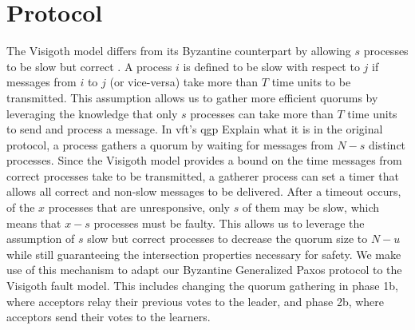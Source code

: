 \section{Protocol} 

The Visigoth model differs from its Byzantine counterpart by allowing $s$ processes to be slow but correct \cite{Porto2015}. A process $i$ is defined to be slow with respect to $j$ if messages from $i$ to $j$ (or vice-versa) take more than $T$ time units to be transmitted. This assumption allows us to gather more efficient quorums by leveraging the knowledge that only $s$ processes can take more than $T$ time units to send and process a message. In \acrshort{vft}'s \acrfull{qgp} {\color{red} Explain what it is in the original protocol}, a process gathers a quorum by waiting for messages from $N-s$ distinct processes. Since the Visigoth model provides a bound on the time messages from correct processes take to be transmitted, a gatherer process can set a timer that allows all correct and non-slow  messages to be delivered. After a timeout occurs, of the $x$ processes that are unresponsive, only $s$ of them may be slow, which means that $x-s$ processes must be faulty. This allows us to leverage the assumption of $s$ slow but correct processes to decrease the quorum size to $N-u$ while still guaranteeing the intersection properties necessary for safety. We make use of this mechanism to adapt our Byzantine Generalized Paxos protocol to the Visigoth fault model. This includes changing the quorum gathering in phase 1b, where acceptors relay their previous votes to the leader, and phase 2b, where acceptors send their votes to the learners. \par
